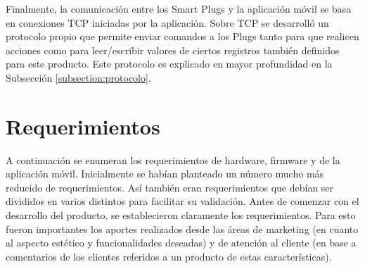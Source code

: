Finalmente, la comunicación entre los Smart Plugs y la aplicación móvil se basa en conexiones TCP iniciadas por la aplicación. Sobre TCP se desarrolló un protocolo propio que permite enviar comandos a los Plugs tanto para que realicen acciones como para leer/escribir valores de ciertos registros también definidos para este producto. Este protocolo es explicado en mayor profundidad en la Subsección \ref{subsection:protocolo}.



\section{Requerimientos}

A continuación se enumeran los requerimientos de hardware, firmware y de la aplicación móvil. Inicialmente se habían planteado un número mucho más reducido de requerimientos. Así también eran requerimientos que debían ser divididos en varios distintos para facilitar su validación. Antes de comenzar con el desarrollo del producto, se establecieron claramente los requerimientos. Para esto fueron importantes los aportes realizados desde las áreas de marketing (en cuanto al aspecto estético y funcionalidades deseadas) y de atención al cliente (en base a comentarios de los clientes referidos a un producto de estas características).

